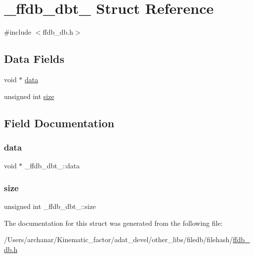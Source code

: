 \hypertarget{struct__ffdb__dbt__}{}\section{\+\_\+ffdb\+\_\+dbt\+\_\+ Struct Reference}
\label{struct__ffdb__dbt__}


{\ttfamily \#include $<$ffdb\+\_\+db.\+h$>$}

\subsection*{Data Fields}
\begin{DoxyCompactItemize}
\item 
void $\ast$ \mbox{\hyperlink{struct__ffdb__dbt___afdd6838a29c80cc996dc48140802feaf}{data}}
\item 
unsigned int \mbox{\hyperlink{struct__ffdb__dbt___a2e25a8697f603a5e7282dbfddbf1be59}{size}}
\end{DoxyCompactItemize}


\subsection{Field Documentation}
\mbox{\label{struct__ffdb__dbt___afdd6838a29c80cc996dc48140802feaf}} 
\subsubsection{\texorpdfstring{data}{data}}
{\footnotesize\ttfamily void $\ast$ \+\_\+ffdb\+\_\+dbt\+\_\+\+::data}

\mbox{\label{struct__ffdb__dbt___a2e25a8697f603a5e7282dbfddbf1be59}} 
\subsubsection{\texorpdfstring{size}{size}}
{\footnotesize\ttfamily unsigned int \+\_\+ffdb\+\_\+dbt\+\_\+\+::size}



The documentation for this struct was generated from the following file\+:\begin{DoxyCompactItemize}
\item 
/\+Users/archanar/\+Kinematic\+\_\+factor/adat\+\_\+devel/other\+\_\+libs/filedb/filehash/\mbox{\hyperlink{other__libs_2filedb_2filehash_2ffdb__db_8h}{ffdb\+\_\+db.\+h}}\end{DoxyCompactItemize}
